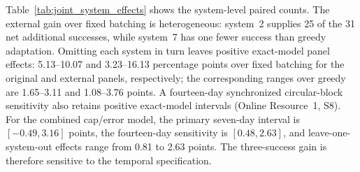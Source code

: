 Table~\ref{tab:joint_system_effects} shows the system-level paired counts.
The external gain over fixed batching is heterogeneous: system~2 supplies
25 of the 31 net additional successes, while system~7 has one fewer success
than greedy adaptation. Omitting each system in turn leaves positive exact-model
panel effects: 5.13--10.07 and 3.23--16.13 percentage points over fixed batching
for the original and external panels, respectively; the corresponding ranges
over greedy are 1.65--3.11 and 1.08--3.76 points. A fourteen-day
synchronized circular-block sensitivity also retains positive exact-model
intervals (Online Resource~1, S8). For the combined cap/error model, the
primary seven-day interval is $[-0.49,3.16]$ points, the fourteen-day
sensitivity is $[0.48,2.63]$, and leave-one-system-out effects range from
0.81 to 2.63 points. The three-success gain is therefore sensitive to the
temporal specification.
